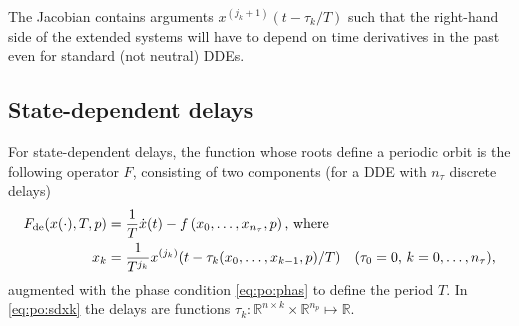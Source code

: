 \documentclass[11pt]{scrartcl}
\newcommand{\R}{\mathbb{R}}
\begin{document}
The Jacobian contains arguments $x^{(j_k+1)}(t-\tau_k/T)$ such that the
right-hand side of the extended systems will have to depend on time
derivatives in the past even for standard (not neutral) DDEs.

\subsection{State-dependent delays}
\label{sec:sd:var}
For state-dependent delays, the function whose roots define a periodic
orbit is the following operator $F$, consisting of two components (for
a DDE with $n_\tau$ discrete delays)
\begin{align}
  \label{eq:po:sddde}
  F_\mathrm{de}(x(\cdot),T,p)&=\frac{1}{T}\dot x(t)-
  f\left(x_0,\ldots,x_{n_\tau},p\right)\mbox{, where}\\
   x_k&=\frac{1}{T^{j_k}}x^{(j_k)}(t-\tau_k(x_0,\ldots,x_{k-1},p)/T)\mbox{\quad ($\tau_0=0$,
     $k=0,\ldots,n_\tau$),}
  \label{eq:po:sdxk}
\end{align}
augmented with the phase condition \eqref{eq:po:phas} to define the
period $T$. In \eqref{eq:po:sdxk} the delays are functions
$\tau_k:\R^{n\times k}\times\R^{n_p}\mapsto\R$.
\end{document}
